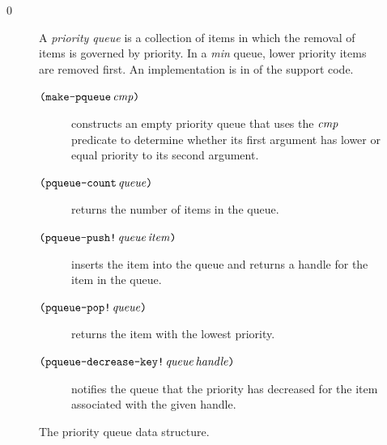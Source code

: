 \documentclass[7x10]{TimesAPriori_MIT}%
\def\racketEd{0}
\def\edition{1}
\numberwithin{theorem}{chapter}
\numberwithin{definition}{chapter}
\numberwithin{equation}{chapter}
\begin{document}
{\if\edition\racketEd      
\begin{figure}[tp]
  \small
  \begin{tcolorbox}[title=Priority Queue]
    A \emph{priority queue}
    is a collection of items in which the
    removal of items is governed by priority. In a \emph{min} queue,
    lower priority items are removed first. An implementation is in
     of the support code.
  \begin{description}
  \item[$\texttt{(}\texttt{make-pqueue}\,\mathit{cmp}\texttt{)}$] constructs an empty
    priority queue that uses the $\mathit{cmp}$ predicate to determine
    whether its first argument has lower or equal priority to its
    second argument.
  \item[$\texttt{(}\texttt{pqueue-count}\,\mathit{queue}\texttt{)}$] returns the number of
    items in the queue.
  \item[$\texttt{(}\texttt{pqueue-push!}\,\mathit{queue}\,\mathit{item}\texttt{)}$] inserts
    the item into the queue and returns a handle for the item in the
    queue.
  \item[$\texttt{(}\texttt{pqueue-pop!}\,\mathit{queue}\texttt{)}$] returns the item with
    the lowest priority.
  \item[$\texttt{(}\texttt{pqueue-decrease-key!}\,\mathit{queue}\,\mathit{handle}\texttt{)}$]
    notifies the queue that the priority has decreased for the item
    associated with the given handle.
  \end{description}
\end{tcolorbox}
  \caption{The priority queue data structure.}
  \label{fig:priority-queue}
\end{figure}
\fi}
\end{document}
